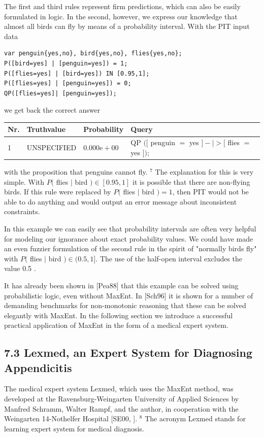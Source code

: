 \documentclass[10pt]{article}
\begin{document}
The first and third rules represent firm predictions, which can also be easily formulated in logic. In the second, however, we express our knowledge that almost all birds can fly by means of a probability interval. With the PIT input data

\begin{verbatim}
var penguin{yes,no}, bird{yes,no}, flies{yes,no};
P([bird=yes] | [penguin=yes]) = 1;
P([flies=yes] | [bird=yes]) IN [0.95,1];
P([flies=yes] | [penguin=yes]) = 0;
QP([flies=yes]| [penguin=yes]);
\end{verbatim}

we get back the correct answer

\begin{center}
\begin{tabular}{llll}
\hline
Nr. & Truthvalue & Probability & Query \\
\hline
1 & UNSPECIFIED & $0.000 \mathrm{e}+00$ & QP $([$ penguin $=$ yes $]-\mid>[$ flies $=$ yes $]) ;$ \\
\hline
\end{tabular}
\end{center}

with the proposition that penguins cannot fly. ${ }^{7}$ The explanation for this is very simple. With $P($ flies $\mid$ bird $) \in[0.95,1]$ it is possible that there are non-flying birds. If this rule were replaced by $P($ flies $\mid$ bird $)=1$, then PIT would not be able to do anything and would output an error message about inconsistent constraints.

In this example we can easily see that probability intervals are often very helpful for modeling our ignorance about exact probability values. We could have made an even fuzzier formulation of the second rule in the spirit of "normally birds fly" with $P($ flies $\mid$ bird $) \in(0.5,1]$. The use of the half-open interval excludes the value 0.5 .

It has already been shown in [Pea88] that this example can be solved using probabilistic logic, even without MaxEnt. In [Sch96] it is shown for a number of demanding benchmarks for non-monotonic reasoning that these can be solved elegantly with MaxEnt. In the following section we introduce a successful practical application of MaxEnt in the form of a medical expert system.

\subsection*{7.3 Lexmed, an Expert System for Diagnosing Appendicitis}
The medical expert system Lexmed, which uses the MaxEnt method, was developed at the Ravensburg-Weingarten University of Applied Sciences by Manfred Schramm, Walter Rampf, and the author, in cooperation with the Weingarten 14-Nothelfer Hospital [SE00, \cite{lexmed1999learning}]. ${ }^{8}$ The acronym Lexmed stands for learning expert system for medical diagnosis.
\end{document}
